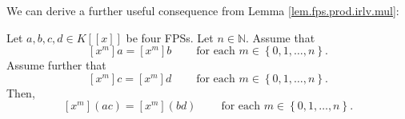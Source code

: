 We can derive a further useful consequence from Lemma
\ref{lem.fps.prod.irlv.mul}:

\begin{lemma}
\label{lem.fps.prod.irlv.cong-mul}Let $a,b,c,d\in K\left[  \left[  x\right]
\right]  $ be four FPSs. Let $n\in\mathbb{N}$. Assume that
\begin{equation}
\left[  x^{m}\right]  a=\left[  x^{m}\right]  b\ \ \ \ \ \ \ \ \ \ \text{for
each }m\in\left\{  0,1,\ldots,n\right\}  .
\label{pf.lem.fps.prod.irlv.cong-mul.assab}%
\end{equation}
Assume further that%
\begin{equation}
\left[  x^{m}\right]  c=\left[  x^{m}\right]  d\ \ \ \ \ \ \ \ \ \ \text{for
each }m\in\left\{  0,1,\ldots,n\right\}  .
\label{pf.lem.fps.prod.irlv.cong-mul.asscd}%
\end{equation}
Then,
\[
\left[  x^{m}\right]  \left(  ac\right)  =\left[  x^{m}\right]  \left(
bd\right)  \ \ \ \ \ \ \ \ \ \ \text{for each }m\in\left\{  0,1,\ldots
,n\right\}  .
\]

\end{lemma}

